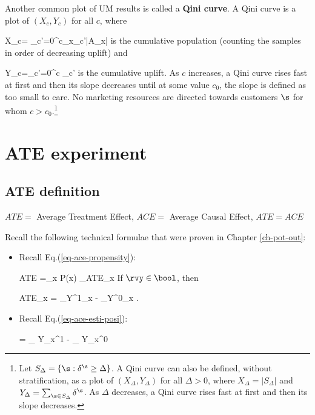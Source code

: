 Another common plot of UM results is
called a {\bf Qini
curve}.
A Qini curve is a plot 
of $(X_c,Y_c)$
for all $c$, where

\beq
X_c= \sum_{c'=0}^{c}\sum_{x\in \calx_{c'}}|A_x|
\eeq
is the cumulative population (counting the
samples in
order of decreasing uplift) and

\beq
Y_c=\sum_{c'=0}^c \Delta_{c'}
\eeq
is the cumulative uplift.
As $c$ increases, a Qini curve rises fast at first and then its slope decreases until
at some value $c_0$, the slope is defined as too small to care. No marketing resources are
directed towards
customers $\s$ for whom  $c>c_0$.\footnote{
Let 
$S_{\Delta} = \{\s:\delta^\s \geq \Delta\}$.
A Qini curve can also be defined, without stratification,
as a
 plot of $(X_\Delta, Y_\Delta)$ for all $\Delta>0$,
where $
X_\Delta = |S_{\Delta}|$
and
$
Y_\Delta= \sum_{\s\in S_{\Delta}}\delta^\s
$. As $\Delta$ decreases, a Qini curve rises fast at first and then its slope decreases.
}

\section{ATE experiment}
\subsection{ATE definition}

$ATE=$ Average Treatment Effect, $ACE =$ Average Causal Effect, $ATE=ACE$

Recall
the following technical formulae
that were proven in 
Chapter \ref{ch-pot-out}:



\begin{itemize}

\item
Recall Eq.(\ref{eq-ace-propensity}):

\beq
ATE =\sum_x P(x)
_{ATE_x}
\eeq
If $\rvy\in \bool$, then

\beq
ATE_x
=
_{\displaystyle Y^1_x}
-
_{\displaystyle Y^0_x}
\;.
\eeq

\item
Recall 
Eq.(\ref{eq-ace-esti-posi}):

\beq
{}
=
_
{\displaystyle Y_x^1}
-
_
{\displaystyle Y_x^0}
\label{eq-est-ace-uplift}
\eeq

\end{itemize}

